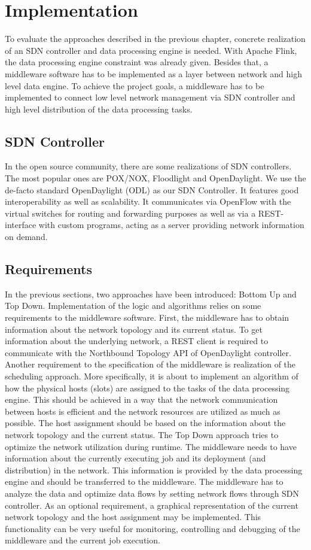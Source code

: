 \section{Implementation}
To evaluate the approaches described in the previous chapter, concrete realization of an SDN
controller and data processing engine is needed. With Apache Flink, the data processing engine
constraint was already given. Besides that, a middleware software has to be implemented as a layer
between network and high level data engine. To achieve the project goals, a middleware has to be
implemented to connect low level network management via SDN controller and high level distribution
of the data processing tasks.

\subsection{SDN Controller}
In the open source community, there are some realizations of SDN controllers. The most popular ones
are POX/NOX, Floodlight and OpenDaylight. We use the de-facto standard OpenDaylight (ODL) as our SDN
Controller. It features good interoperability as well as scalability. It communicates via OpenFlow
with the virtual switches for routing and forwarding purposes as well as via a REST-interface with
custom programs, acting as a server providing network information on demand. 

\subsection{Requirements}
In the previous sections, two approaches have been introduced: Bottom Up and Top Down.
Implementation of the logic and algorithms relies on some requirements to the middleware software.
First, the middleware has to obtain information about the network topology and its current status.
To get information about the underlying network, a REST client is required to communicate with the
Northbound Topology API of OpenDaylight controller. Another requirement to the specification of the
middleware is realization of the scheduling approach. More specifically, it is about to implement an
algorithm of how the physical hosts (slots) are assigned to the tasks of the data processing engine.
This should be achieved in a way that the network communication between hosts is efficient and the
network resources are utilized as much as possible. The host assignment should be based on the
information about the network topology and the current status. The Top Down approach tries to
optimize the network utilization during runtime. The middleware needs to have information about the
currently executing job and its deployment (and distribution) in the network. This information is
provided by the data processing engine and should be transferred to the middleware. The middleware
has to analyze the data and optimize data flows by setting network flows through SDN controller. As
an optional requirement, a graphical representation of the current network topology and the host
assignment may be implemented. This functionality can be very useful for monitoring, controlling and
debugging of the middleware and the current job execution.

